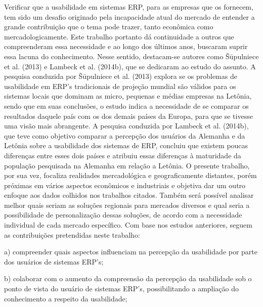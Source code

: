 Verificar que a usabilidade em sistemas ERP, para as empresas que os fornecem, tem sido um desafio originado pela incapacidade atual do mercado de entender a grande contribuição que o tema pode trazer, tanto econômica como mercadologicamente. Este trabalho portanto dá continuidade a outros que compreenderam essa necessidade e ao longo dos últimos anos, buscaram suprir essa lacuna do conhecimento. Nesse sentido, destacam-se autores como Šūpulniece et al. (2013) e Lambeck et al. (2014b), que se dedicaram ao estudo do assunto.\newline
\indent A pesquisa conduzida por Šūpulniece et al. (2013) explora se os problemas de usabilidade em ERP’s tradicionais de projeção mundial são válidos para os sistemas locais que dominam as micro, pequenas e médias empresas na Letônia, sendo que em suas conclusões, o estudo indica a necessidade de se comparar os resultados daquele país com os dos demais países da Europa, para que se tivesse uma visão mais abrangente.\newline
\indent A pesquisa conduzida por Lambeck et al. (2014b), que teve como objetivo comparar a percepção dos usuários da Alemanha e da Letônia sobre a usabilidade dos sistemas de ERP, concluiu que existem poucas diferenças entre esses dois países e atribuiu essas diferenças à maturidade da população pesquisada na Alemanha em relação a Letônia.\newline
\indent O presente trabalho, por sua vez, focaliza realidades mercadológica e geograficamente distantes, porém próximas em vários aspectos econômicos e industriais e objetiva dar um outro enfoque aos dados colhidos nos trabalhos citados.\newline
\indent Também será possível analisar melhor quais seriam as soluções regionais para mercados diversos e qual seria a possibilidade de personalização dessas soluções, de acordo com a necessidade individual de cada mercado específico.\newline
\indent Com base nos estudos anteriores, seguem as contribuições pretendidas neste trabalho:
	\begin{flushright}
	\begin{minipage}{.955\textwidth}
		a) compreender quais aspectos influenciam na percepção da usabilidade por parte dos usuários de sistemas ERP’s;
	\end{minipage}
	\end{flushright}

	\begin{flushright}
	\begin{minipage}{.955\textwidth}
		b) colaborar com o aumento da compreensão da percepção da usabilidade sob o ponto de vista do usuário de sistemas ERP’s, possibilitando a ampliação do conhecimento a respeito da usabilidade;
	\end{minipage}
	\end{flushright}

